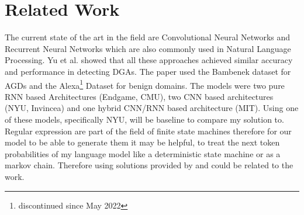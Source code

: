 \documentclass[a4paper, 12pt]{article}
\begin{document}
\section{Related Work}
The current state of the art in the field are Convolutional Neural Networks and Recurrent Neural
Networks which are also commonly used in Natural Language Processing. Yu et al.
\cite{yuCharacterLevelBased2018} showed that all these approaches achieved similar accuracy and performance
in detecting DGAs.  The paper used the Bambenek dataset \cite{BambenekFeed} for AGDs and the
Alexa\footnote{discontinued since May 2022} Dataset for benign
domains. The models were two pure RNN based Architectures (Endgame, CMU), two CNN based
architectures (NYU, Invincea) and one hybrid CNN/RNN based architecture (MIT). Using one of these
models, specifically NYU, will be baseline to compare my solution to.
Regular expression are part of the field of finite state machines therefore for our model to be able
to generate them it may be helpful, to treat the next token probabilities of my language model like
a deterministic state machine or as a markov chain. Therefore using solutions provided by
\cite{neumannConvertingDeterministicFinite} and \cite{beehTransformationsMarkovChains} could be
related to the work.

\clearpage

\printbibliography
\end{document}
